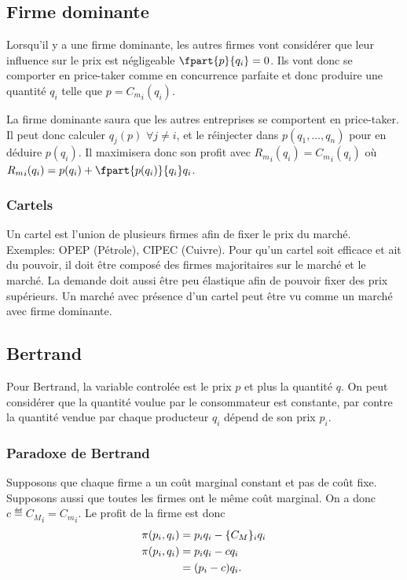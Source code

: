\subsection{Firme dominante}
Lorsqu'il y a une firme dominante,
les autres firmes vont considérer que leur influence sur le prix
est négligeable $\fpart{p}{q_i} = 0$.
Ils vont donc se comporter en price-taker comme en concurrence parfaite
et donc produire une quantité $q_i$ telle que $p = {C_m}_i(q_i)$.

La firme dominante saura que les autres entreprises
se comportent en price-taker.
Il peut donc calculer $q_j(p)$ $\forall j \neq i$,
et le réinjecter dans $p(q_1,\ldots,q_n)$ pour en déduire $p(q_i)$.
Il maximisera donc son profit avec ${R_m}_i(q_i) = {C_m}_i(q_i)$
où ${R_m}_i(q_i) = p(q_i) + \fpart{p(q_i)}{q_i}q_i$.

\subsubsection{Cartels}
Un cartel est l'union de plusieurs firmes afin de fixer le prix du marché.
Exemples: OPEP (Pétrole), CIPEC (Cuivre).
Pour qu'un cartel soit efficace et ait du pouvoir, il doit être composé
des firmes majoritaires sur le marché et le marché. La demande doit aussi
être peu élastique afin de pouvoir fixer des prix supérieurs.
Un marché avec présence d'un cartel peut être vu comme un marché avec firme dominante.


\subsection{Bertrand}
Pour Bertrand, la variable controlée est le prix $p$ et plus la quantité $q$.
On peut considérer que la quantité voulue par le consommateur est constante,
par contre la quantité vendue par chaque producteur $q_i$ dépend
de son prix $p_i$.

\subsubsection{Paradoxe de Bertrand}
Supposons que chaque firme a un coût marginal constant et pas de coût fixe.
Supposons aussi que toutes les firmes ont le même coût marginal.
On a donc $c \eqdef {C_M}_i = {C_m}_i$.
Le profit de la firme est donc
\begin{align}
  \nonumber
  \pi(p_i,q_i) & = p_iq_i - \{C_M\}_iq_i\\
  \nonumber
  \pi(p_i,q_i) & = p_iq_i - cq_i\\
  \label{eq:pbert}
  & = (p_i-c)q_i.
\end{align}


